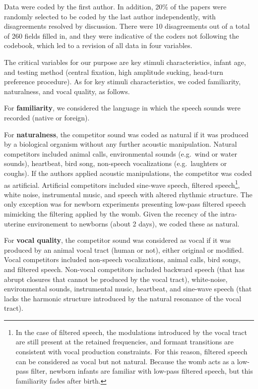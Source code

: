 \documentclass[man]{apa6}
\let\rmarkdownfootnote\footnote%
\def\footnote{\protect\rmarkdownfootnote}
\begin{document}
Data were coded by the first author. In addition, 20\% of the papers were randomly selected to be coded by the last author independently, with disagreements resolved by discussion. There were 10 disagreements out of a total of 260 fields filled in, and they were indicative of the coders not following the codebook, which led to a revision of all data in four variables.

The critical variables for our purpose are key stimuli characteristics, infant age, and testing method (central fixation, high amplitude sucking, head-turn preference procedure). As for key stimuli characteristics, we coded familiarity, naturalness, and vocal quality, as follows.

For \textbf{familiarity}, we considered the language in which the speech sounds were recorded (native or foreign).

For \textbf{naturalness}, the competitor sound was coded as natural if it was produced by a biological organism without any further acoustic manipulation. Natural competitors included animal calls, environmental sounds (e.g.~wind or water sounds), heartbeat, bird song, non-speech vocalizations (e.g.~laughters or coughs). If the authors applied acoustic manipulations, the competitor was coded as artificial. Artificial competitors included sine-wave speech, filtered speech\footnote{In the case of filtered speech, the modulations introduced by the vocal tract are still present at the retained frequencies, and formant transitions are consistent with vocal production constraints. For this reason, filtered speech can be considered as vocal but not natural. Because the womb acts as a low-pass filter, newborn infants are familiar with low-pass filtered speech, but this familiarity fades after birth.}, white noise, instrumental music, and speech with altered rhythmic structure. The only exception was for newborn experiments presenting low-pass filtered speech mimicking the filtering applied by the womb. Given the recency of the intra-uterine environement to newborns (about 2 days), we coded these as natural.

For \textbf{vocal quality}, the competitor sound was considered as vocal if it was produced by an animal vocal tract (human or not), either original or modified. Vocal competitors included non-speech vocalizations, animal calls, bird songs, and filtered speech. Non-vocal competitors included backward speech (that has abrupt closures that cannot be produced by the vocal tract), white-noise, environmental sounds, instrumental music, heartbeat, and sine-wave speech (that lacks the harmonic structure introduced by the natural resonance of the vocal tract).
\end{document}
